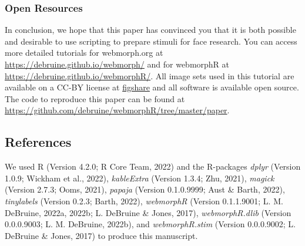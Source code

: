 \documentclass[
  doc,floatsintext]{apa6}
\begin{document}
\hypertarget{open-resources}{%
\subsubsection{Open Resources}\label{open-resources}}

In conclusion, we hope that this paper has convinced you that it is both possible and desirable to use scripting to prepare stimuli for face research. You can access more detailed tutorials for webmorph.org at \url{https://debruine.github.io/webmorph/} and for webmorphR at \url{https://debruine.github.io/webmorphR/}. All image sets used in this tutorial are available on a CC-BY license at \href{https://figshare.com/search?q=webmorph\%20psychomorph}{figshare} and all software is available open source. The code to reproduce this paper can be found at \url{https://github.com/debruine/webmorphR/tree/master/paper}.

\newpage

\hypertarget{references}{%
\subsection{References}\label{references}}

We used R (Version 4.2.0; R Core Team, 2022) and the R-packages \emph{dplyr} (Version 1.0.9; Wickham et al., 2022), \emph{kableExtra} (Version 1.3.4; Zhu, 2021), \emph{magick} (Version 2.7.3; Ooms, 2021), \emph{papaja} (Version 0.1.0.9999; Aust \& Barth, 2022), \emph{tinylabels} (Version 0.2.3; Barth, 2022), \emph{webmorphR} (Version 0.1.1.9001; L. M. DeBruine, 2022a, 2022b; L. DeBruine \& Jones, 2017), \emph{webmorphR.dlib} (Version 0.0.0.9003; L. M. DeBruine, 2022b), and \emph{webmorphR.stim} (Version 0.0.0.9002; L. DeBruine \& Jones, 2017) to produce this manuscript.

\begingroup
\setlength{\parindent}{-0.5in}
\setlength{\leftskip}{0.5in}
\end{document}
